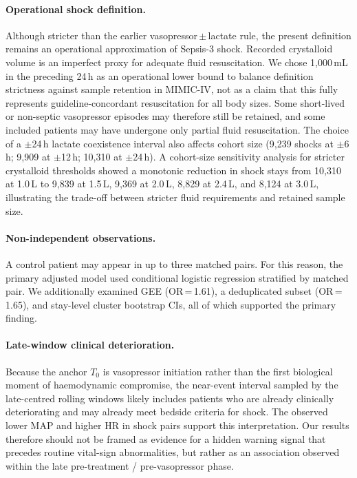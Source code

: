 \documentclass[referee,lineno,pdflatex]{sn-article-template/sn-jnl}
\begin{document}
\paragraph{Operational shock definition.}
Although stricter than the earlier vasopressor\,$\pm$\,lactate rule, the present
definition remains an operational approximation of Sepsis-3 shock.
Recorded crystalloid volume is an imperfect proxy for adequate fluid resuscitation.
We chose 1,000\,mL in the preceding 24\,h as an operational lower bound to balance
definition strictness against sample retention in MIMIC-IV, not as a claim that this
fully represents guideline-concordant resuscitation for all body sizes.
Some short-lived or non-septic vasopressor episodes may therefore still be retained,
and some included patients may have undergone only partial fluid resuscitation.
The choice of a $\pm$24\,h lactate coexistence interval also affects cohort size
(9,239 shocks at $\pm$6\,h; 9,909 at $\pm$12\,h; 10,310 at $\pm$24\,h).
A cohort-size sensitivity analysis for stricter crystalloid thresholds showed a monotonic
reduction in shock stays from 10,310 at 1.0\,L to 9,839 at 1.5\,L, 9,369 at 2.0\,L,
8,829 at 2.4\,L, and 8,124 at 3.0\,L, illustrating the trade-off between stricter fluid
requirements and retained sample size.

\paragraph{Non-independent observations.}
A control patient may appear in up to three matched pairs.
For this reason, the primary adjusted model used conditional logistic regression
stratified by matched pair.
We additionally examined GEE (OR\,=\,1.61), a deduplicated subset (OR\,=\,1.65),
and stay-level cluster bootstrap CIs, all of which supported the primary finding.

\paragraph{Late-window clinical deterioration.}
Because the anchor $T_0$ is vasopressor initiation rather than the first biological
moment of haemodynamic compromise, the near-event interval sampled by the late-centred
rolling windows likely includes patients who are already clinically deteriorating and may
already meet bedside criteria for shock.
The observed lower MAP and higher HR in shock pairs support this interpretation.
Our results therefore should not be framed as evidence for a hidden warning signal
that precedes routine vital-sign abnormalities, but rather as an association observed
within the late pre-treatment / pre-vasopressor phase.
\end{document}
